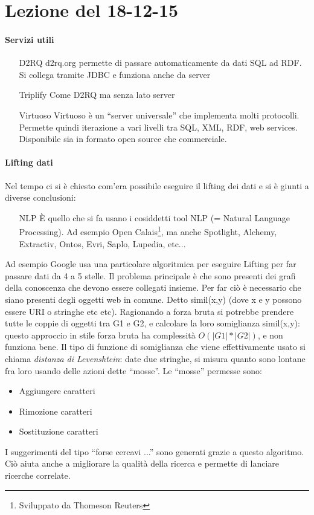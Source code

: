 \section{Lezione del 18-12-15}

\paragraph*{Servizi utili}
\begin{itemize}
\item[D2RQ] d2rq.org permette di passare automaticamente da dati SQL ad RDF. Si collega tramite JDBC e funziona anche da server
\item[Triplify] Come D2RQ ma senza lato server
\item[Virtuoso] Virtuoso \`e un ``server universale'' che implementa molti protocolli. Permette quindi iterazione a vari livelli tra SQL, XML, RDF, web services. Disponibile sia in formato open source che commerciale.
\end{itemize}

\paragraph*{Lifting dati} Nel tempo ci si \`e chiesto com'era possibile eseguire il lifting dei dati e si \`e giunti a diverse conclusioni:
\begin{itemize}
\item[NLP] \`E quello che si fa usano i cosiddetti tool NLP (= Natural Language Processing). Ad esempio Open Calais\footnote{Sviluppato da Thomeson Reuters}, ma anche Spotlight, Alchemy, Extractiv, Ontos, Evri, Saplo, Lupedia, etc...
\end{itemize}

Ad esempio Google usa una particolare algoritmica per eseguire Lifting per far passare dati da 4 a 5 stelle. Il problema principale \`e che sono presenti dei grafi della conoscenza che devono essere collegati insieme. Per far ci\`o \`e necessario che siano presenti degli oggetti web in comune. Detto simil(x,y) (dove x e y possono essere URI o stringhe etc etc). Ragionando a forza bruta si potrebbe prendere tutte le coppie di oggetti tra G1 e G2, e calcolare la loro somiglianza simil(x,y): questo approccio in stile forza bruta ha complessit\`a $O(|G1|*|G2|)$, e non funziona bene. Il tipo di funzione di somiglianza che viene effettivamente usato si chiama \textit{distanza di Levenshtein}: date due stringhe, si misura quanto sono lontane fra loro usando delle azioni dette ``mosse''. Le ``mosse'' permesse sono:
\begin{itemize}
\item Aggiungere caratteri
\item Rimozione caratteri
\item Sostituzione caratteri
\end{itemize}
I suggerimenti del tipo ``forse cercavi ...'' sono generati grazie a questo algoritmo. Ci\`o aiuta anche a migliorare la qualit\`a della ricerca e permette di lanciare ricerche correlate.

